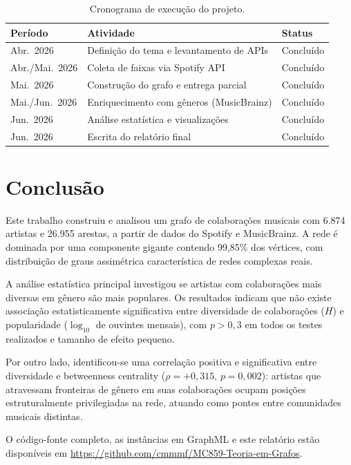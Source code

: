 \documentclass[12pt,a4paper]{article}
\begin{document}
\begin{table}[H]
\centering
\caption{Cronograma de execução do projeto.}
\label{tab:cronograma}
\begin{tabular}{lll}
\toprule
\textbf{Período} & \textbf{Atividade} & \textbf{Status} \\
\midrule
Abr.\ 2026 & Definição do tema e levantamento de APIs & Concluído \\
Abr./Mai.\ 2026 & Coleta de faixas via Spotify API & Concluído \\
Mai.\ 2026 & Construção do grafo e entrega parcial & Concluído \\
Mai./Jun.\ 2026 & Enriquecimento com gêneros (MusicBrainz) & Concluído \\
Jun.\ 2026 & Análise estatística e visualizações & Concluído \\
Jun.\ 2026 & Escrita do relatório final & Concluído \\
\bottomrule
\end{tabular}
\end{table}

\section{Conclusão}

Este trabalho construiu e analisou um grafo de colaborações musicais com 6.874 artistas e 26.955 arestas, a partir de dados do Spotify e MusicBrainz. A rede é dominada por uma componente gigante contendo 99,85\% dos vértices, com distribuição de graus assimétrica característica de redes complexas reais.

A análise estatística principal investigou se artistas com colaborações mais diversas em gênero são mais populares. Os resultados indicam que não existe associação estatisticamente significativa entre diversidade de colaborações ($H$) e popularidade ($\log_{10}$ de ouvintes mensais), com $p > 0{,}3$ em todos os testes realizados e tamanho de efeito pequeno.

Por outro lado, identificou-se uma correlação positiva e significativa entre diversidade e betweenness centrality ($\rho = +0{,}315$, $p = 0{,}002$): artistas que atravessam fronteiras de gênero em suas colaborações ocupam posições estruturalmente privilegiadas na rede, atuando como pontes entre comunidades musicais distintas.

O código-fonte completo, as instâncias em GraphML e este relatório estão disponíveis em \url{https://github.com/cmmmf/MC859-Teoria-em-Grafos}.
\end{document}
